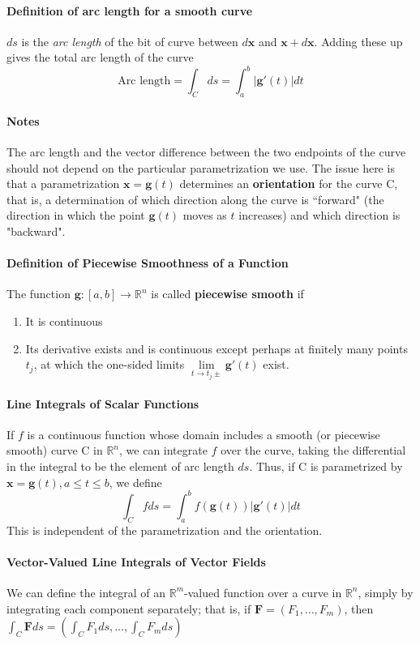 \documentclass[11pt]{article}
\newcommand{\ti}[1]{\textit{#1}}
\newcommand{\tb}[1]{\textbf{#1}}
\newcommand{\real}[0]{\mathbb{R}}
\newcommand{\vx}[0]{\tb{x}}
\begin{document}
\paragraph{Definition of arc length for a smooth curve}
$ds$ is the \ti{arc length} of the bit of curve between $d\vx$ and $\vx + d\vx$. Adding these up gives the total arc length of the curve
$$\mbox{Arc length} = \int_C ds = \int_a^b|\tb{g}'(t)|dt$$
\paragraph{Notes} The arc length and the vector difference between the two endpoints of the curve should not depend on the particular parametrization we use. The issue here is that a parametrization $\vx = \tb{g}(t)$ determines an \tb{orientation} for the curve C, that is, a determination of which direction along the curve is ``forward" (the direction in which the point $\tb{g}(t)$ moves as $t$ increases) and which direction is "backward". 
\paragraph{Definition of Piecewise Smoothness of a Function} The function $\tb{g}: [a,b] \rightarrow \real^n$ is called \tb{piecewise smooth} if
\begin{enumerate}
    \item It is continuous
    \item Its derivative exists and is continuous except perhaps at finitely many points $t_j$, at which the one-sided limits $\underset{t\rightarrow t_j\pm}{\lim}\tb{g}'(t)$ exist. 
\end{enumerate}
\paragraph{Line Integrals of Scalar Functions} 
If $f$ is a continuous function whose domain includes a smooth (or piecewise smooth) curve C in $\real^n$, we can integrate $f$ over the curve, taking the differential in the integral to be the element of arc length $ds$. Thus, if C is parametrized by $\vx = \tb{g}(t), a\leq t \leq b$, we define
$$\int_C f ds = \int_a^b f(\tb{g}(t))|\tb{g}'(t)|dt$$ This is independent of the parametrization and the orientation.
\paragraph{Vector-Valued Line Integrals of Vector Fields} We can define the integral of an $\real^m$-valued function over a curve in $\real^n$, simply by integrating each component separately; that is, if $\tb{F} = (F_1,\hdots,F_m)$, then $\int_C\tb{F}ds = (\int_C F_1ds,\hdots,\int_C F_mds)$
\end{document}

